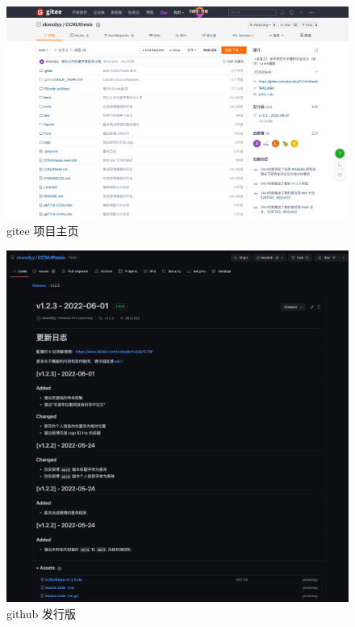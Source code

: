 \documentclass{ccnudoc}
\begin{document}
\begin{figure}[htbp]
  \centering
  \includegraphics[width = \textwidth]{gitee项目主页.png}
  \caption{gitee 项目主页}
  \label{figure:gitee项目主页}
\end{figure}


\begin{figure}[htbp]
  \centering
  \includegraphics[width = \textwidth]{github发行版.png}
  \caption{github 发行版}
  \label{figure:github发行版}
\end{figure}
\end{document}
